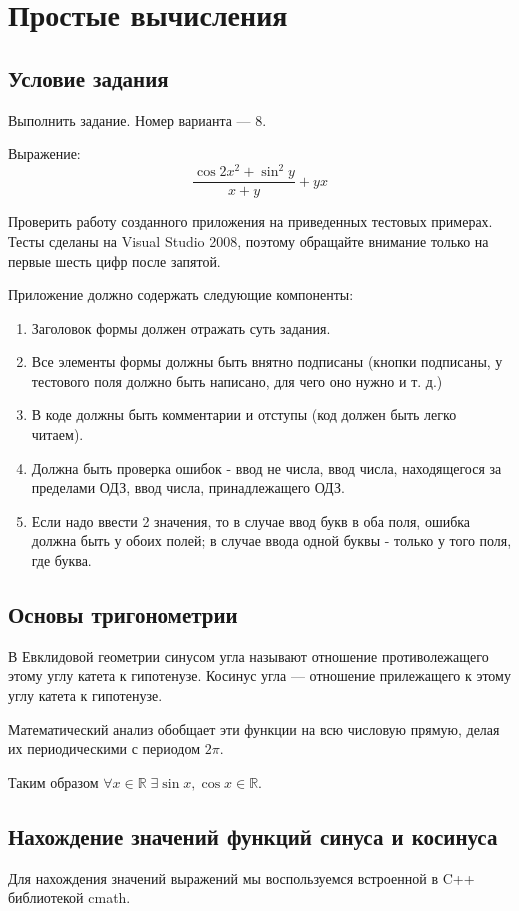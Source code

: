 \section{Простые вычисления}
\subsection{Условие задания}
Выполнить задание. Номер варианта --- 8.

Выражение:
\begin{equation}
\frac{\cos{2x^2} + \sin^2{y}}{x + y} + yx
\end{equation}

Проверить работу созданного приложения на приведенных тестовых примерах. Тесты сделаны на Visual Studio 2008, поэтому обращайте внимание только на первые шесть цифр после запятой.

Приложение должно содержать следующие компоненты:

\begin{enumerate}
\item Заголовок формы должен отражать суть задания.
\item Все элементы формы должны быть внятно подписаны (кнопки подписаны, у тестового поля должно быть написано, для чего оно нужно и т. д.)
\item В коде должны быть комментарии и отступы (код должен быть легко читаем).
\item Должна быть проверка ошибок - ввод не числа, ввод числа, находящегося за пределами ОДЗ, ввод числа, принадлежащего ОДЗ.
\item Если надо ввести 2 значения, то в случае ввод букв в оба поля, ошибка должна быть у обоих полей; в случае ввода одной буквы - только у того поля, где буква.
\end{enumerate}

\subsection{Основы тригонометрии}
В Евклидовой геометрии синусом угла называют отношение противолежащего этому углу катета к гипотенузе. Косинус угла --- отношение прилежащего к этому углу катета к гипотенузе.

Математический анализ обобщает эти функции на всю числовую прямую, делая их периодическими с периодом $2\pi$.

Таким образом $\forall x \in \mathbb{R}\; \exists \sin{x}, \cos{x} \in \mathbb{R}$.

\subsection{Нахождение значений функций синуса и косинуса}
Для нахождения значений выражений мы воспользуемся встроенной в C++ библиотекой cmath.

